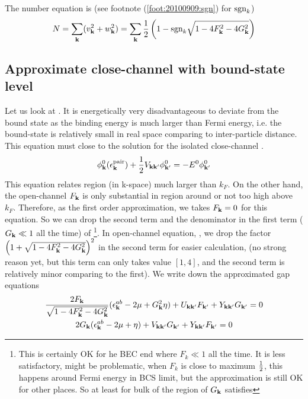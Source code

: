 \documentclass{article}
\begin{document}
The number equation is (see footnote (\ref{foot:20100909:sgn}) for $\text{sgn}_{k}$)
\begin{equation}\label{eq:20100909:number}
N=\sum_{\mathbf{k}}(v_{\mathbf{k}}^{2}+w_{\mathbf{k}}^{2})=\sum_{\mathbf{k}}\frac{1}{2} \left(1-\text{sgn}_{k}\sqrt{1-4 F_{\mathbf{k}}^2-4 G_{\mathbf{k}}^2}\right)
\end{equation} 


\subsection{Approximate close-channel with bound-state level}
Let us look at .  It is energetically very disadvantageous to deviate from the bound state as the binding energy is much  larger than Fermi energy, i.e. the bound-state is relatively small in real space comparing to inter-particle distance.     This equation must close to  the solution for the isolated close-channel \sch.  
\begin{equation}\label{eq:20100915:twobody}
{\phi^{0}_{\ensuremath{\mathbf{k}}}}(\epsilon^{\text{pair}}_{\mathbf{k}})+\frac{1}{2}V_{\mathbf{k}\mathbf{k}'}\phi^{0}_{\mathbf{k}'}=-E^{0}\phi^{0}_{\mathbf{k}'}
\end{equation}
This equation relates region (in k-space) much larger than $k_{F}$.  On the other hand, the open-channel 
$F_{\mathbf{k}}$ is only substantial in region around or not too high above  $k_{F}$.  Therefore, as the first order approximation, we takes $F_{\mathbf{k}}=0$ for this equation. So we can drop the second term and the denominator in the first term ($G_{\mathbf{k}}\ll1$ all the time) of \footnote{ This is certainly OK for he BEC end where $F_{k}\ll1$ all the time.  It is less satisfactory, might be problematic,  when $F_{k}$ is close to maximum $\frac{1}{2}$, this happens around Fermi energy in BCS limit, but the approximation is still OK for other places. So at least for bulk of the region of $G_{\mathbf{k}}$ satisfies }.  In  open-channel equation, , we drop the factor $\left(1+\sqrt{1-4 F_{\mathbf{k}}^2-4 G_{\mathbf{k}}^2}\right)^2$ in the second term for easier calculation, (no strong reason yet, but this term can only takes value $[1,4]$, and the second term is relatively minor comparing to the first). We write down the approximated gap equations
\begin{subequations}\label{eq:20100915:gap}
\begin{gather}\label{eq:20100915:gapa}
\frac{2F_{\mathbf{k}}}{\sqrt{1-4 F_{\mathbf{k}}^2-4 G_{\mathbf{k}}^2}} (\epsilon^{ab}_{\mathbf{k}}-2\mu+  G_{\mathbf{k}}^2\eta)+U_{\mathbf{k}\mathbf{k}'}F_{\mathbf{k}'}+Y_{\mathbf{k}\mathbf{k}'}G_{\mathbf{k}'}=0\\
\label{eq:20100915:gapb}
{2G_{\ensuremath{\mathbf{k}}}}(\epsilon^{ab}_{\mathbf{k}}-2\mu+\eta)+V_{\mathbf{k}\mathbf{k}'}G_{\mathbf{k}'}+Y_{\mathbf{k}\mathbf{k}'}F_{\mathbf{k}'}=0
\end{gather}
\end{subequations}
\end{document}
